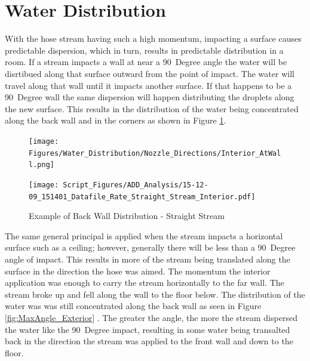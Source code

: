 \documentclass[12pt,oneside]{book}
\begin{document}
\section{Water Distribution}

With the hose stream having such a high momentum, impacting a surface causes predictable dispersion, which in turn, results in predictable distribution in a room. If a stream impacts a wall at near a 90~Degree angle the water will be disrtibued along that surface outward from the point of impact. The water will travel along that wall until it impacts another surface. If that happens to be a 90~Degree wall the same dispersion will happen distributing the droplets along the new surface. This results in the distribution of the water being concentrated along the back wall and in the corners as shown in Figure \ref{fig:Interior_Atwall_Example}.

\begin{figure}[H]
	\centering
	\begin{minipage}[b]{0.45\textwidth}
	\centering
	\texttt{[image: Figures/Water\_Distribution/Nozzle\_Directions/Interior\_AtWall.png]} 
	\end{minipage}
	\begin{minipage}[b]{0.45\textwidth}
	\centering
	\texttt{[image: Script\_Figures/ADD\_Analysis/15-12-09\_151401\_Datafile\_Rate\_Straight\_Stream\_Interior.pdf]}
	\end{minipage}
	\caption{Example of Back Wall Distribution - Straight Stream}
	\label{fig:Interior_Atwall_Example}
\end{figure}

The same general principal is applied when the stream impacts a horizontal surface such as a ceiling; however, generally there will be less than a 90~Degree angle of impact. This results in more of the stream being translated along the surface in the direction the hose was aimed. The momentum the interior application was enough to carry the stream horizontally to the far wall. The stream broke up and fell along the wall to the floor below. The distribution of the water was was still concentrated along the back wall as seen in Figure \ref{fig:MaxAngle_Exterior} . The greater the angle, the more the stream dispersed the water like the 90~Degree impact, resulting in some water being transalted back in the direction the stream was applied to the front wall and down to the floor.
\end{document}
